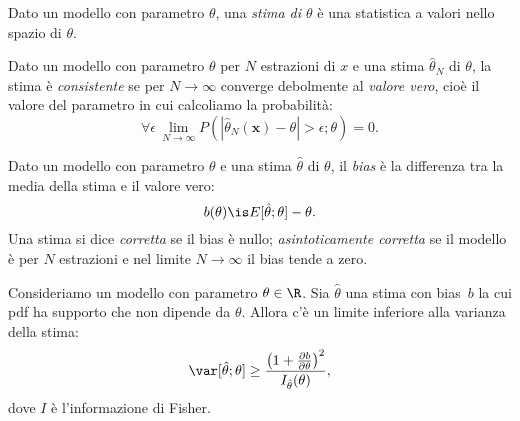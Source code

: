 

\begin{definition}[Stima]
	Dato un modello con parametro $\theta$,
	una \emph{stima di $\theta$} è una statistica a valori nello spazio di $\theta$.
\end{definition}

\begin{definition}[Consistenza]
	Dato un modello con parametro $\theta$ per $N$ estrazioni di $x$
	e una stima $\hat\theta_N$ di $\theta$,
	la stima è \emph{consistente}
	se per $N\to\infty$ converge debolmente al \emph{valore vero},
	cioè il valore del parametro in cui calcoliamo la probabilità:
	\begin{equation*}
		\forall\epsilon\, \lim_{N\to\infty} P(|\hat\theta_N(\mathbf x)-\theta| > \epsilon;\theta) = 0.
	\end{equation*}
\end{definition}

\begin{definition}[Bias]
	Dato un modello con parametro $\theta$ e una stima $\hat\theta$ di $\theta$,
	il \emph{bias} è la differenza tra la media della stima e il valore vero:
	\begin{equation*}
		b(\theta) \is E[\hat\theta;\theta] - \theta.
	\end{equation*}
	Una stima si dice \emph{corretta} se il bias è nullo;
	\emph{asintoticamente corretta} se il modello è per $N$ estrazioni
	e nel limite $N\to\infty$ il bias tende a zero.
\end{definition}


\begin{theorem}
	\label{th:cramerrao}
	Consideriamo un modello con parametro $\theta\in\R$.
	Sia $\hat\theta$ una stima con bias~$b$
	la cui pdf ha supporto che non dipende da $\theta$.
	Allora c'è un limite inferiore alla varianza della stima:
	\begin{equation*}
		\var[\hat\theta;\theta] \ge \frac{\left( 1 + \frac{\partial b}{\partial\theta} \right)^2}{I_{\hat\theta}(\theta)},
	\end{equation*}
	dove $I$ è l'informazione di Fisher.
\end{theorem}

